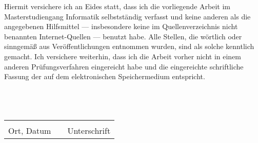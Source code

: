 Hiermit versichere ich an Eides statt, dass ich die vorliegende Arbeit im Masterstudiengang Informatik selbstständig verfasst und keine anderen als die angegebenen Hilfsmittel --- insbesondere keine im Quellenverzeichnis nicht benannten Internet-Quellen --- benutzt habe. Alle Stellen, die wörtlich oder sinngemäß aus Veröffentlichungen entnommen wurden, sind als solche kenntlich gemacht. Ich versichere weiterhin, dass ich die Arbeit vorher nicht in einem anderen Prüfungsverfahren eingereicht habe und die eingereichte schriftliche Fassung der auf dem elektronischen Speichermedium entspricht.
\\
\\
\\
\\

\begin{tabular}{lp{2em}l}
 \hspace{5cm}   && \hspace{5cm} \\
 \cline{1-1}\cline{3-3}
 Ort, Datum     && Unterschrift
\end{tabular}